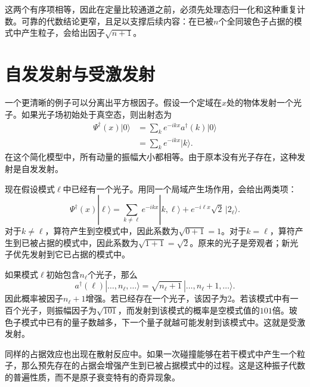 这两个有序项相等，因此在定量比较通道之前，必须先处理态归一化和这种重复计数。可靠的代数结论更窄，且足以支撑后续内容：在已被\(n\)个全同玻色子占据的模式中产生粒子，会给出因子\(\sqrt{n+1}\)。

\section{自发发射与受激发射}

一个更清晰的例子可以分离出平方根因子。假设一个定域在\(x\)处的物体发射一个光子。如果光子场初始处于真空态，则出射态为
\begin{align}
\Psi^\dagger(x)|0\rangle
&=\sum_k e^{-ikx}a^\dagger(k)|0\rangle\\
&=\sum_k e^{-ikx}|k\rangle.
\end{align}
在这个简化模型中，所有动量的振幅大小都相等。由于原本没有光子存在，这种发射是自发发射。

现在假设模式\(\ell\)中已经有一个光子。用同一个局域产生场作用，会给出两类项：
\begin{equation}
\Psi^\dagger(x)|\ell\rangle
=
\sum_{k\ne\ell}e^{-ikx}|k,\ell\rangle
+e^{-i\ell x}\sqrt{2}\,|2_\ell\rangle.
\end{equation}
对于\(k\ne\ell\)，算符产生到空模式中，因此系数为\(\sqrt{0+1}=1\)。对于\(k=\ell\)，算符产生到已被占据的模式中，因此系数为\(\sqrt{1+1}=\sqrt{2}\)。原来的光子是旁观者；新光子优先发射到它已占据的模式中。

\begin{classroomqa}
\end{classroomqa}

如果模式\(\ell\)初始包含\(n_\ell\)个光子，那么
\begin{equation}
a^\dagger(\ell)
|\ldots,n_\ell,\ldots\rangle
=
\sqrt{n_\ell+1}
\,|\ldots,n_\ell+1,\ldots\rangle.
\end{equation}
因此概率被因子\(n_\ell+1\)增强。若已经存在一个光子，该因子为\(2\)。若该模式中有一百个光子，则振幅因子为\(\sqrt{101}\)，而发射到该模式的概率是空模式值的\(101\)倍。玻色子模式中已有的量子数越多，下一个量子就越可能发射到该模式中。这就是受激发射。

同样的占据效应也出现在散射反应中。如果一次碰撞能够在若干模式中产生一个粒子，那么预先存在的占据会增强产生到已被占据模式中的过程。这是这种振子代数的普遍性质，而不是原子衰变特有的奇异现象。

